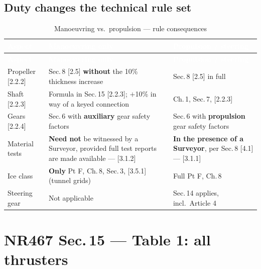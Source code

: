 \documentclass[11pt,a4paper]{report}
\begin{document}
\subsection{Duty changes the technical rule set}
\begin{longtable}{|p{3.6cm}|p{5.4cm}|p{5.4cm}|}
\caption{Manoeuvring vs.\ propulsion --- rule consequences} \label{tab:dutysplit} \\
\hline
\rowcolor{bvblue}
\textcolor{white}{\textbf{Aspect}} & \textcolor{white}{\textbf{Manoeuvring only}} & \textcolor{white}{\textbf{Propulsion / steering}} \\
\hline
\endfirsthead
\hline
\rowcolor{bvblue}
\textcolor{white}{\textbf{Aspect}} & \textcolor{white}{\textbf{Manoeuvring only}} & \textcolor{white}{\textbf{Propulsion / steering}} \\
\hline
\endhead
\hline
\endlastfoot
Propeller [2.2.2] & Sec.\,8 [2.5] \textbf{without} the 10\% thickness increase & Sec.\,8 [2.5] in full \\
\hline
Shaft [2.2.3] & Formula in Sec.\,15 [2.2.3]; $+$10\% in way of a keyed connection & Ch.\,1, Sec.\,7, [2.2.3] \\
\hline
Gears [2.2.4] & Sec.\,6 with \textbf{auxiliary} gear safety factors & Sec.\,6 with \textbf{propulsion} gear safety factors \\
\hline
Material tests & \textbf{Need not} be witnessed by a Surveyor, provided full test reports are made available --- [3.1.2] & \textbf{In the presence of a Surveyor}, per Sec.\,8 [4.1] --- [3.1.1] \\
\hline
Ice class & \textbf{Only} Pt F, Ch.\,8, Sec.\,3, [3.5.1] (tunnel grids) & Full Pt F, Ch.\,8 \\
\hline
Steering gear & Not applicable & Sec.\,14 applies, incl.\ Article 4 \\
\hline
\end{longtable}

\newpage

\section{NR467 Sec.\,15 --- Table 1: all thrusters}
\end{document}
